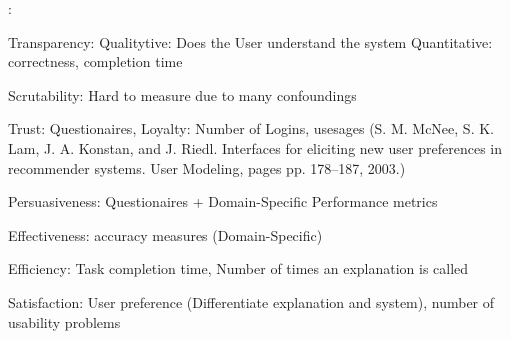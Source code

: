  \cite{tintarev2007survey}:
 
 Transparency: Qualitytive: Does the User understand the system Quantitative: correctness, completion time
 
 Scrutability: Hard to measure due to many confoundings
 
 Trust: Questionaires, Loyalty: Number of Logins, usesages (S. M. McNee, S. K. Lam, J. A. Konstan, and J. Riedl. Interfaces for eliciting new user preferences in recommender systems. User Modeling, pages pp. 178–187, 2003.)
 
 Persuasiveness: Questionaires + Domain-Specific Performance metrics
 
 Effectiveness: accuracy measures (Domain-Specific) 
 
 Efficiency: Task completion time, Number of times an explanation is called
 
 Satisfaction: User preference (Differentiate explanation and system), number of usability problems
 
 